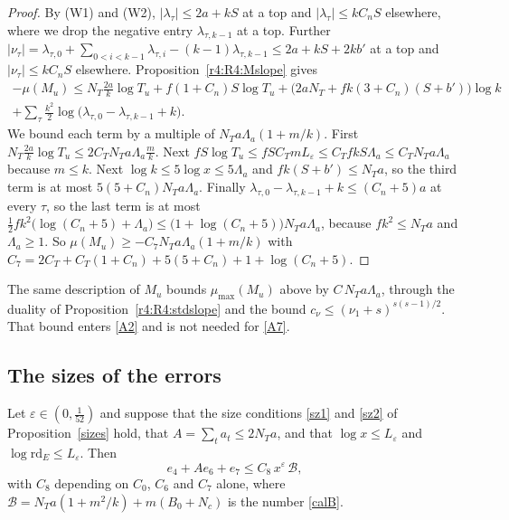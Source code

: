 \begin{proof}
By (W1) and (W2), $\lvert\lambda_\tau\rvert\le2a+kS$ at a top and $\lvert\lambda_\tau\rvert\le kC_nS$ elsewhere, where we drop the negative entry $\lambda_{\tau,k-1}$ at a top. Further $\lvert\nu_\tau\rvert=\lambda_{\tau,0}+\sum_{0<i<k-1}\lambda_{\tau,i}-(k-1)\lambda_{\tau,k-1}\le2a+kS+2kb'$ at a top and $\lvert\nu_\tau\rvert\le kC_nS$ elsewhere. Proposition~\ref{r4:R4:Mslope} gives
\begin{multline*}
-\mu(M_u)\le N_T\frac{2a}k\log T_u+f(1+C_n)S\log T_u+\big(2aN_T+fk(3+C_n)(S+b')\big)\log k\\
+\sum_\tau\frac{k^2}2\log\big(\lambda_{\tau,0}-\lambda_{\tau,k-1}+k\big).
\end{multline*}
We bound each term by a multiple of $N_Ta\Lambda_a(1+m/k)$. First $N_T\frac{2a}k\log T_u\le2C_TN_Ta\Lambda_a\frac mk$. Next $fS\log T_u\le fSC_TmL_\varepsilon\le C_TfkS\Lambda_a\le C_TN_Ta\Lambda_a$ because $m\le k$. Next $\log k\le5\log x\le5\Lambda_a$ and $fk(S+b')\le N_Ta$, so the third term is at most $5(5+C_n)N_Ta\Lambda_a$. Finally $\lambda_{\tau,0}-\lambda_{\tau,k-1}+k\le(C_n+5)a$ at every $\tau$, so the last term is at most $\frac12fk^2\big(\log(C_n+5)+\Lambda_a\big)\le\big(1+\log(C_n+5)\big)N_Ta\Lambda_a$, because $fk^2\le N_Ta$ and $\Lambda_a\ge1$. So $\mu(M_u)\ge-C_7N_Ta\Lambda_a(1+m/k)$ with $C_7=2C_T+C_T(1+C_n)+5(5+C_n)+1+\log(C_n+5)$.
\end{proof}

\begin{remark}\label{r4:R4:Mmax}
The same description of $M_u$ bounds $\mu_{\max}(M_u)$ above by $C\,N_Ta\Lambda_a$, through the duality of Proposition~\ref{r4:R4:stdslope} and the bound $c_\nu\le(\nu_1+s)^{s(s-1)/2}$. That bound enters \eqref{A2} and is not needed for \eqref{A7}.
\end{remark}

\subsection{The sizes of the errors}\label{r4:sec:R4sizes}

\begin{proposition}\label{r4:R4:sizes}
Let $\varepsilon\in(0,\frac1{52})$ and suppose that the size conditions \eqref{sz1} and \eqref{sz2} of Proposition~\ref{sizes} hold, that $A=\sum_ta_t\le2N_Ta$, and that $\log x\le L_\varepsilon$ and $\log\mathrm{rd}_E\le L_\varepsilon$. Then
\[
e_4+Ae_6+e_7\le C_8\,x^{\varepsilon}\,\mathcal B,
\]
with $C_8$ depending on $C_0$, $C_6$ and $C_7$ alone, where $\mathcal B=N_Ta(1+m^2/k)+m(B_0+N_c)$ is the number \eqref{calB}.
\end{proposition}

